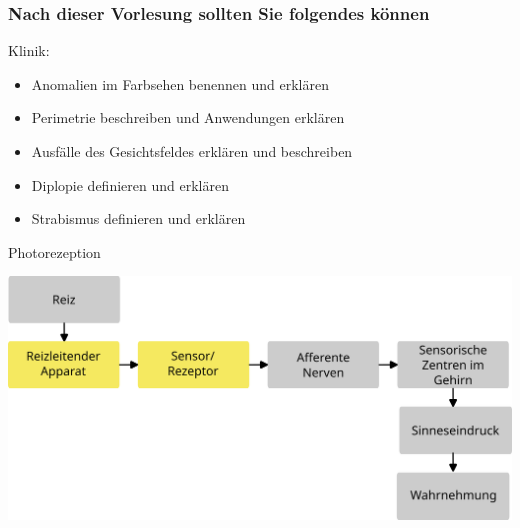 \documentclass{beamer}
\begin{document}
\begin{frame}

 \frametitle{Nach dieser Vorlesung sollten Sie folgendes können}

 

\begin{block}{Klinik:}

\begin{itemize}
    
\item 
Anomalien im Farbsehen benennen und erklären
    \item 
Perimetrie beschreiben und Anwendungen erklären
    \item 
Ausfälle des Gesichtsfeldes erklären und beschreiben
    \item 
Diplopie definieren und erklären
    \item 
Strabismus definieren und erklären

\end{itemize}


\end{block}



\end{frame}






\begin{frame}{Photorezeption}
    \begin{center}
        \includegraphics[width=\textwidth]{wahrnehmungsprozess_ohne_beispiel_apparat_und_sensor.png}
        
    \end{center}
\end{frame}
\end{document}
